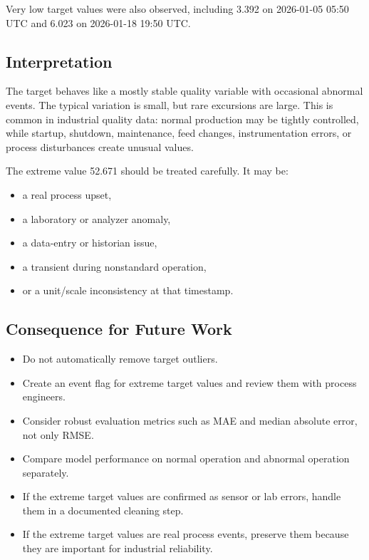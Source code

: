 \documentclass[11pt,a4paper]{article}
\begin{document}
Very low target values were also observed, including 3.392 on 2026-01-05 05:50 UTC and 6.023 on 2026-01-18 19:50 UTC.

\subsection{Interpretation}

The target behaves like a mostly stable quality variable with occasional abnormal events. The typical variation is small, but rare excursions are large. This is common in industrial quality data: normal production may be tightly controlled, while startup, shutdown, maintenance, feed changes, instrumentation errors, or process disturbances create unusual values.

The extreme value 52.671 should be treated carefully. It may be:

\begin{itemize}
    \item a real process upset,
    \item a laboratory or analyzer anomaly,
    \item a data-entry or historian issue,
    \item a transient during nonstandard operation,
    \item or a unit/scale inconsistency at that timestamp.
\end{itemize}

\subsection{Consequence for Future Work}

\begin{itemize}
    \item Do not automatically remove target outliers.
    \item Create an event flag for extreme target values and review them with process engineers.
    \item Consider robust evaluation metrics such as MAE and median absolute error, not only RMSE.
    \item Compare model performance on normal operation and abnormal operation separately.
    \item If the extreme target values are confirmed as sensor or lab errors, handle them in a documented cleaning step.
    \item If the extreme target values are real process events, preserve them because they are important for industrial reliability.
\end{itemize}
\end{document}
